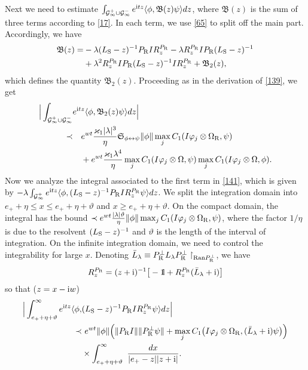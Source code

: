 \documentclass[letterpaper,onecolumn,11pt,accepted=2021-12-09]{quantumarticle}
\numberwithin{equation}{section}
\newcommand{\sym}{ {\mathfrak S}_{\phi\leftrightarrow\psi}}
\renewcommand{\r}{{\rm R}}
\newcommand{\s}{{\rm S}}
\renewcommand{\i}{{\rm i}}
\newcommand{\bbbone}{\mathchoice {\rm 1\mskip-4mu l} {\rm 1\mskip-4mu l}
	{\rm 1\mskip-4.5mu l} {\rm 1\mskip-5mu l}}
\begin{document}
Next we need to estimate $\int_{{\mathcal G}_\infty^+\cup {\mathcal G}_\infty^-} e^{\i tz} \langle \phi, {\mathfrak B}(z) \psi\rangle  dz$, where ${\mathfrak B}(z)$ is the sum of three terms according to \eqref{17}. In each term, we use \eqref{65} to split off the main part. Accordingly, we have
\begin{align}
{\mathfrak B}(z)  = & -\lambda (L_\s-z)^{-1} P_\r I R_z^{P_\r} - \lambda R_z^{P_\r} I P_\r(L_\s-z)^{-1} \nonumber\\
 & +\lambda^2 R_z^{P_\r} IP_\r (L_\s-z)^{-1} IR_z^{P_\r} +{\mathfrak B}_2(z), 
 \label{141}
\end{align} 
which defines the quantity ${\mathfrak B}_2(z)$.  Proceeding as in the derivation of \eqref{139}, we get
\begin{align}
\Big| \int_{{\mathcal G}_\infty^+\cup {\mathcal G}_\infty^-} & e^{\i tz} \langle \phi, {\mathfrak B}_2(z) \psi\rangle  dz\Big| \nonumber\\
 \prec &  \quad e^{wt} \frac{\varkappa_1|\lambda|^3}{\eta} \sym \|\phi\|  \max_j C_1(I\varphi_j\otimes\Omega_\r,\psi) \nonumber\\
& \quad + e^{wt} \frac{\varkappa_1\lambda^4}{\eta}  \max_j C_1(I\varphi_j\otimes\Omega,\psi) \max_j C_1(I\varphi_j\otimes\Omega,\phi) .
	\label{63.1}
\end{align}
Now we analyze the integral associated to the first term in \eqref{141}, which is given by $-\lambda \int_{{\mathcal G}_\infty^+}e^{\i tz}\langle\phi, (L_\s-z)^{-1} P_\r IR_z^{P_\r}\psi\rangle dz$. We split the integration domain into  $e_++\eta\le x\le e_++\eta+\vartheta$ and $x\ge e_++\eta+\vartheta$. On the compact domain, the integral has the bound $\prec e^{wt} \frac{|\lambda|\vartheta}{\eta} \|\phi\| \max_j C_1(I\varphi_j\otimes\Omega_\r,\psi)$, where the factor $1/\eta$ is due to the resolvent $(L_\s-z)^{-1}$ and $\vartheta$ is the length of the interval of integration. On the infinite integration domain, we need to control the integrability for large $x$. Denoting $\bar L_\lambda\equiv P^\perp_\r L_\lambda P^\perp_\r\upharpoonright_{{\rm Ran}P^\perp_\r}$, we have
\begin{equation}
R_z^{P_\r} = (z+\i)^{-1}\big[-\bbbone + R_z^{P_\r}(\bar L_\lambda+\i)\big]
\label{144}
\end{equation}
so that ($z=x-\i w$)
\begin{align}
\Big| \int_{e_++\eta+\vartheta}^\infty e^{\i tz}  \langle\phi, & (L_\s-z)^{-1} P_\r  IR_z^{P_\r}\psi\rangle dz \Big| \nonumber\\
\prec &  \ e^{wt}  \|\phi\| \Big( \|P_\r I\| \|P^\perp_\r\psi\| + \max_j C_1\big(I\varphi_j\otimes\Omega_\r,(\bar L_\lambda+\i)\psi\big)\Big) \nonumber\\
&  \times \int_{e_++\eta+\vartheta}^\infty\  \frac{dx }{|e_+-z| |z+\i|}.
  \label{144.1}
\end{align}
\end{document}
